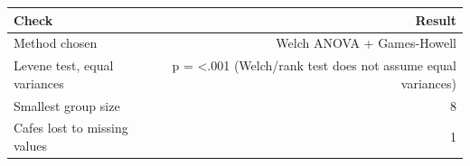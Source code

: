 \begin{tabular}{lr}
\toprule
Check & Result \\
\midrule
Method chosen & Welch ANOVA + Games-Howell \\
Levene test, equal variances & p = <.001 (Welch/rank test does not assume equal variances) \\
Smallest group size & 8 \\
Cafes lost to missing values & 1 \\
\bottomrule
\end{tabular}
